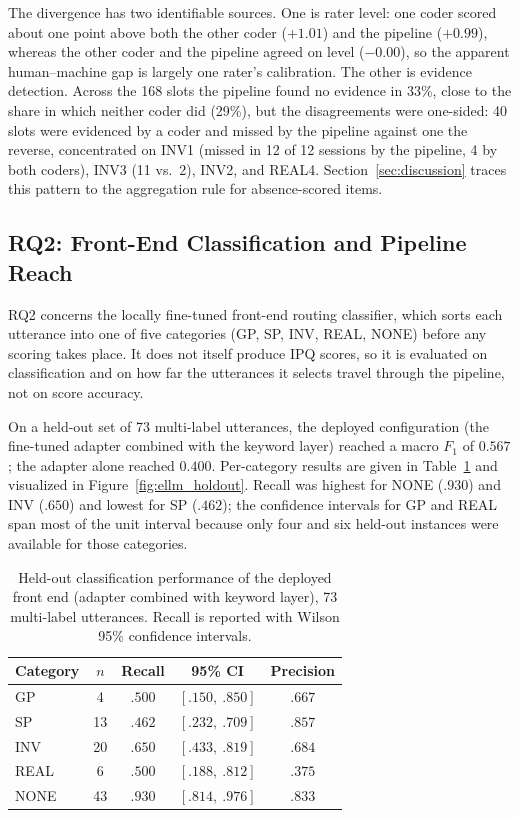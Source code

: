 The divergence has two identifiable sources. One is rater level: one coder scored about one point above both the other coder ($+1.01$) and the pipeline ($+0.99$), whereas the other coder and the pipeline agreed on level ($-0.00$), so the apparent human--machine gap is largely one rater's calibration. The other is evidence detection. Across the 168 slots the pipeline found no evidence in 33\%, close to the share in which neither coder did (29\%), but the disagreements were one-sided: 40 slots were evidenced by a coder and missed by the pipeline against one the reverse, concentrated on INV1 (missed in 12 of 12 sessions by the pipeline, 4 by both coders), INV3 (11 vs.\ 2), INV2, and REAL4. Section~\ref{sec:discussion} traces this pattern to the aggregation rule for absence-scored items.

\subsection{RQ2: Front-End Classification and Pipeline Reach}
\label{subsec:rq2}

RQ2 concerns the locally fine-tuned front-end routing classifier, which sorts each utterance into one of five categories (GP, SP, INV, REAL, NONE) before any scoring takes place. It does not itself produce IPQ scores, so it is evaluated on classification and on how far the utterances it selects travel through the pipeline, not on score accuracy.

On a held-out set of 73 multi-label utterances, the deployed configuration (the fine-tuned adapter combined with the keyword layer) reached a macro $F_1$ of $0.567$; the adapter alone reached $0.400$. Per-category results are given in Table~\ref{tab:gate} and visualized in Figure~\ref{fig:ellm_holdout}. Recall was highest for NONE ($.930$) and INV ($.650$) and lowest for SP ($.462$); the confidence intervals for GP and REAL span most of the unit interval because only four and six held-out instances were available for those categories.

\begin{table}[t]
\centering
\caption{Held-out classification performance of the deployed front end (adapter combined with keyword layer), 73 multi-label utterances. Recall is reported with Wilson 95\% confidence intervals.}
\label{tab:gate}
\small
\begin{tabular}{lcccc}
\hline
Category & $n$ & Recall & 95\% CI & Precision \\
\hline
GP & 4 & $.500$ & $[.150,\ .850]$ & $.667$ \\
SP & 13 & $.462$ & $[.232,\ .709]$ & $.857$ \\
INV & 20 & $.650$ & $[.433,\ .819]$ & $.684$ \\
REAL & 6 & $.500$ & $[.188,\ .812]$ & $.375$ \\
NONE & 43 & $.930$ & $[.814,\ .976]$ & $.833$ \\
\hline
\end{tabular}
\end{table}

